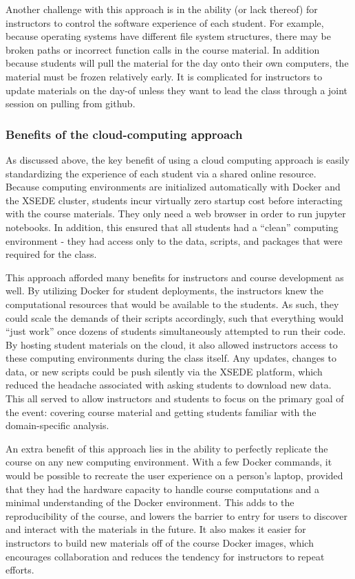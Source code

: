 Another challenge with this approach is in the ability (or lack thereof) for
instructors to control the software experience of each student. For example,
because operating systems have different file system structures, there may be
broken paths or incorrect function calls in the course material. In addition
because students will pull the material for the day onto their own computers,
the material must be frozen relatively early. It is complicated for instructors
to update materials on the day-of unless they want to lead the class through a
joint session on pulling from github.

\subsubsection{Benefits of the cloud-computing approach}

As discussed above, the key benefit of using a cloud computing approach is
easily standardizing the experience of each student via a shared online
resource. Because computing environments are initialized automatically with
Docker and the XSEDE cluster, students incur virtually zero startup cost before
interacting with the course materials. They only need a web browser in order to
run jupyter notebooks. In addition, this ensured that all students had a
``clean'' computing environment - they had access only to the data, scripts, and
packages that were required for the class.

This approach afforded many benefits for instructors and course development as
well. By utilizing Docker for student deployments, the instructors knew the
computational resources that would be available to the students. As such, they
could scale the demands of their scripts accordingly, such that everything would
``just work'' once dozens of students simultaneously attempted to run their
code. By hosting student materials on the cloud, it also allowed instructors
access to these computing environments during the class itself. Any updates,
changes to data, or new scripts could be push silently via the XSEDE platform,
which reduced the headache associated with asking students to download new data.
This all served to allow instructors and students to focus on the primary goal
of the event: covering course material and getting students familiar with the
domain-specific analysis.

An extra benefit of this approach lies in the ability to perfectly replicate the
course on any new computing environment. With a few Docker commands, it would be
possible to recreate the user experience on a person's laptop, provided that
they had the hardware capacity to handle course computations and a minimal
understanding of the Docker environment. This adds to the reproducibility of the
course, and lowers the barrier to entry for users to discover and interact with
the materials in the future. It also makes it easier for instructors to build
new materials off of the course Docker images, which encourages collaboration
and reduces the tendency for instructors to repeat efforts.

